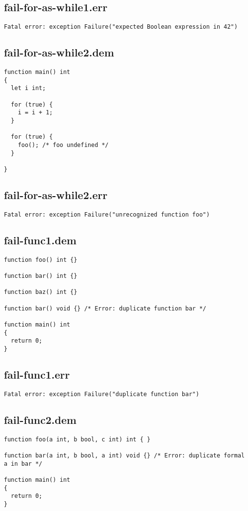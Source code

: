 \subsection{fail-for-as-while1.err}
\begin{lstlisting}
Fatal error: exception Failure("expected Boolean expression in 42")
\end{lstlisting}
\subsection{fail-for-as-while2.dem}
\begin{lstlisting}
function main() int
{
  let i int;

  for (true) {
    i = i + 1;
  }

  for (true) {
    foo(); /* foo undefined */
  }

}
\end{lstlisting}
\subsection{fail-for-as-while2.err}
\begin{lstlisting}
Fatal error: exception Failure("unrecognized function foo")
\end{lstlisting}
\subsection{fail-func1.dem}
\begin{lstlisting}
function foo() int {}

function bar() int {}

function baz() int {}

function bar() void {} /* Error: duplicate function bar */

function main() int
{
  return 0;
}
\end{lstlisting}
\subsection{fail-func1.err}
\begin{lstlisting}
Fatal error: exception Failure("duplicate function bar")
\end{lstlisting}
\subsection{fail-func2.dem}
\begin{lstlisting}
function foo(a int, b bool, c int) int { }

function bar(a int, b bool, a int) void {} /* Error: duplicate formal a in bar */

function main() int
{
  return 0;
}
\end{lstlisting}
